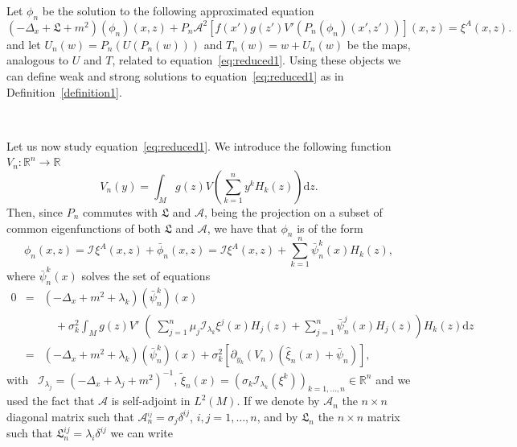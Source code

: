 \documentclass[a4paper,10pt]{article}
\newcommand{\mathd}{\mathrm{d}}
\begin{document}
Let $\phi_n$ be the solution to the following approximated equation
\begin{equation}
  (- \Delta_x + \mathfrak{L} + m^2) (\phi_n) (x, z) + P_n \mathcal{A}^2 [f
  (x') g (z') V' (\mathcal{} P_n (\phi_n) (x', z'))] (x, z) = \mathcal{} \xi^A
  (x, z) . \label{eq:reduced1}
\end{equation}
and let $U_n (w) = P_n (U (P_n (w)))$ and $T_n (w) = w + U_n (w)$ be the maps,
analogous to $U$ and $T$, related to equation~{\eqref{eq:reduced1}}. Using
these objects we can define weak and strong solutions to
equation~{\eqref{eq:reduced1}} as in Definition~\ref{definition1}.

\

Let us now study equation~{\eqref{eq:reduced1}}. We introduce the following
function $V_n : \mathbb{R}^n \rightarrow \mathbb{R}$
\[ V_n (y) = \int_M g (z) V \left( \sum_{k = 1}^n y^k H_k (z) \right) \mathd
   z. \]
Then, since $P_n$ commutes with $\mathfrak{L}$ and $\mathcal{A}$, being the
projection on a subset of common eigenfunctions of both $\mathfrak{L}$ and
$\mathcal{A}$, we have that $\phi_n$ is of the form
\[ \phi_n (x, z) = \mathcal{I}_{\mathfrak{}} \xi^A (x, z) + \bar{\phi}_n (x,
   z) = \mathcal{I} \xi^A (x, z) + \sum_{k = 1}^n \bar{\psi}_n^k (x) H_k (z),
\]
where $\bar{\psi}^k_n (x)$ solves the set of equations
\begin{equation}
  \begin{array}{lll}
    0 & = & (- \Delta_x + m^2 + \lambda_k) (\bar{\psi}^k_n) (x)\\
    &  & \quad + \sigma_k^2 \int_M g (z) \left. V' \middle( \sum_{j = 1}^n
    \mu_j \mathcal{I}_{\lambda_k} \xi^j (x) H_j (z) + \left. \sum_{j = 1}^n
    \bar{\psi}^j_n (x) \mathcal{} H_j (z) \right) H_k (z) \mathd z \right.\\
    & = & (- \Delta_x + m^2 + \lambda_k) (\bar{\psi}^k_n) (x) + \sigma_k^2
    [\partial_{y_k} (V_n) (\hat{\xi}_n (x) + \bar{\psi}_n)],
  \end{array} \label{eq:reduced2}
\end{equation}
with \ $\mathcal{I}_{\lambda_j} = (- \Delta_x + \lambda_j + m^2)^{- 1}$,
$\tilde{\xi}_n (x) = (\sigma_k \mathcal{I}_{\lambda_k} (\xi^k))_{k = 1,
\ldots, n} \in \mathbb{R}^n$ and we used the fact that $\mathcal{A}$ is
self-adjoint in $L^2 (M)$. If we denote by $\mathcal{A}_n$ the $n \times n$
diagonal matrix such that $\mathcal{A}^{_{i j}}_n = \sigma_j \delta^{i j}$,
$i, j = 1, \ldots, n$, and by $\mathfrak{L}_n$ the $n \times n$ matrix such
that $\mathfrak{L}_n^{i j} = \lambda_i \delta^{i j}$ we can write
\end{document}
